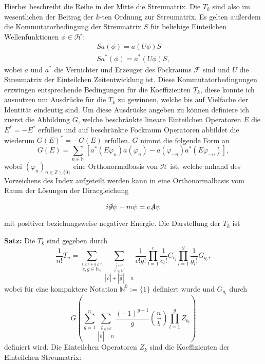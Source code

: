 \documentclass[a4paper,12pt]{article}
\begin{document}
Hierbei beschreibt die Reihe in der Mitte die Streumatrix. Die \(T_k\) sind also im wesentlichen der Beitrag der
 \(k\)-ten Ordnung zur Streumatrix. Es gelten außerdem die Kommutatorbedingung der Streumatrix \(S\) für beliebige
 Einteilchen Wellenfunktionen \(\phi\in \mathcal{H}\):
 \begin{subequations}\label{SKommutator}
\begin{align}
S a(\phi)=a(U\phi) S\\
S a^*(\phi)=a^*(U\phi) S,
\end{align}
\end{subequations}
wobei \(a\) und \(a^*\) die Vernichter und Erzeuger des Fockraums \(\mathcal{F}\) sind und \(U\) die Streumatrix der 
Einteilchen Zeitentwicklung ist. Diese Kommutatorbedingungen erzwingen entsprechende Bedingungen für die 
Koeffizienten \(T_k\), diese konnte ich ausnutzen um Ausdrücke für die \(T_k\) zu gewinnen, welche bis auf 
Vielfache der Identität eindeutig sind. Um diese Ausdrücke angeben zu können definiere ich zuerst die Abbildung \(G\),
welche beschränkte lineare Einteilchen Operatoren \(E\) die \(E^*=-E^*\)  erfüllen und auf beschränkte Fockraum Operatoren
abbildet die wiederum \(G(E)^*=-G(E)\) erfüllen. \(G\) nimmt die folgende Form an
\begin{equation}
G(E)=\sum_{n\in \mathbb{N}} \left[a^*(E\varphi_n)a(\varphi_n) - a(\varphi_{-n})a^*(E\varphi_{-n})\right],
\end{equation}
wobei \( (\varphi_n)_{n\in \mathbb{Z}\backslash \{0\}}\) eine Orthonormalbasis von \(\mathcal{H}\) ist, welche anhand
des Vorzeichens des Index aufgeteilt werden kann in eine Orthonormalbasis vom Raum der Lösungen der Diracgleichung

\begin{equation}\label{diraceq}
i \slashed{\partial}\psi - m \psi = e \slashed{A}\psi
\end{equation}

mit positiver beziehungsweise negativer Energie. Die Darstellung der \(T_k\) ist


{\bfseries Satz:}
Die \(T_k\) sind gegeben durch
\begin{equation}
\frac{1}{n!} T_n = \sum_{\stackrel{1\le c+g\le n}{c,g\in\mathbb{N}_0}} 
\sum_{\stackrel{\stackrel{\vec{g}\in\mathbb{N}^g}{\vec{c}\in\mathbb{N}^c}}{|\vec{c}| + |\vec{g}|=n}} 
\frac{1}{c! g!} \prod_{l=1}^c \frac{1}{c_l!} C_{c_l} \prod_{l=1}^g \frac{1}{g_l!} G_{g_l},
\end{equation}
wobei für eine kompaktere Notation \(\mathbb{N}^0:= \{1\}\) definiert wurde und \(G_{g_l}\) durch
\begin{equation}
G\left( \sum_{g=1}^n \sum_{\stackrel{\vec{b}\in\mathbb{N}^g}{|\vec{b}|=n}}\frac{(-1)^{g+1}}{g} 
\binom{n}{\vec{b}} \prod_{l=1}^g Z_{b_l}  \right)
\end{equation}
definiert wird. Die Einteilchen Operatoren \(Z_k\) sind die Koeffizienten der Einteilchen Streumatrix:
\end{document}
